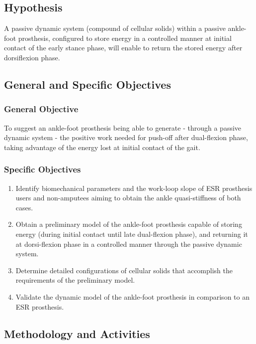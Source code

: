 \documentclass[12pt,english]{article}
\begin{document}
\subsection{Hypothesis}

A passive dynamic system (compound of cellular solids) within a passive ankle-foot prosthesis, configured to store energy in a controlled manner at initial contact of the early stance phase, will enable to return the stored energy after dorsiflexion phase.



\subsection{General and Specific Objectives}

\subsubsection{General Objective} To suggest an ankle-foot prosthesis being able to generate - through a passive dynamic system - the positive work needed for push-off after dual-flexion phase, taking advantage of the energy lost at initial contact of the gait.

\subsubsection{Specific Objectives}
\begin{enumerate}
\item Identify biomechanical parameters and the work-loop slope of ESR prosthesis users and non-amputees aiming to obtain the ankle quasi-stiffness of both cases.

\item Obtain a preliminary model of the ankle-foot prosthesis capable of storing energy (during initial contact until late dual-flexion phase), and returning it at dorsi-flexion phase in a controlled manner through the passive dynamic system.

\item Determine detailed configurations of cellular solids that accomplish the requirements of the preliminary model.
\item Validate the dynamic model of the ankle-foot prosthesis in comparison to an ESR prosthesis. \end{enumerate}

\subsection{Methodology and Activities}
\end{document}
